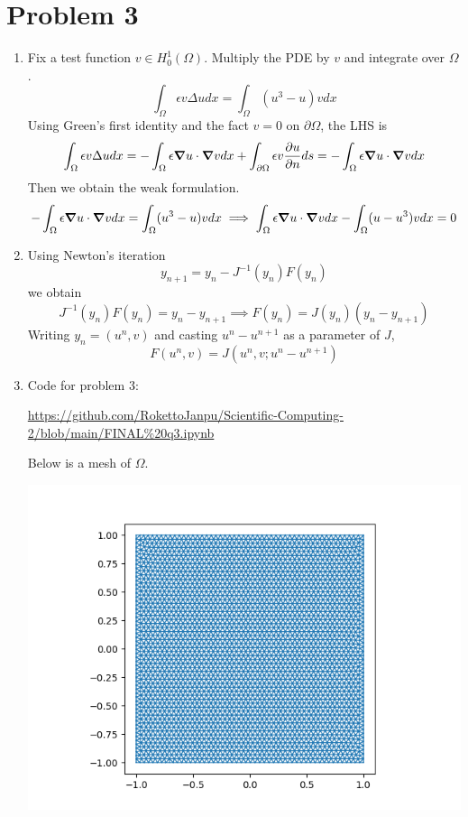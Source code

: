 \documentclass{article}
\newcommand{\ep}{\epsilon}
\newcommand{\inv}{^{-1}}
\newcommand{\imp}{\implies}
\newcommand{\ptl}{\partial}
\newcommand{\Om}{\Omega}
\begin{document}
\section*{Problem 3}

\begin{enumerate}[label=(\alph*)]
	
\item
Fix a test function $v\in H_0^1(\Omega)$. Multiply the PDE by $v$ and integrate over $\Omega$.
$$\int_\Om \ep v\Delta udx = \int_\Om (u^3-u)vdx$$
Using Green's first identity and the fact $v=0$ on $\ptl\Om$, the LHS is
$$\int_\Om \ep v\Delta udx = -\int_\Om \ep\grad u\cdot\grad vdx + \int_{\ptl\Om} \ep v\pdv{u}{n}ds
= -\int_\Om \ep\grad u\cdot\grad vdx$$
Then we obtain the weak formulation.
$$-\int_\Om \ep\grad u\cdot\grad vdx = \int_\Om (u^3-u)vdx
\imp \int_\Om \ep\grad u\cdot\grad vdx - \int_\Om (u-u^3)vdx = 0$$


\item
Using Newton's iteration
$$y_{n+1} = y_n - J\inv(y_n)F(y_n)$$
we obtain
$$J\inv(y_n)F(y_n) = y_n - y_{n+1}
\imp F(y_n) = J(y_n)(y_n - y_{n+1})$$
Writing $y_n=(u^n,v)$ and casting $u^n-u^{n+1}$ as a parameter of $J$,
$$F(u^n,v) = J(u^n,v;u^n-u^{n+1})$$


\item
Code for problem 3:

\url{https://github.com/RokettoJanpu/Scientific-Computing-2/blob/main/FINAL%20q3.ipynb}

Below is a mesh of $\Omega$.

\begin{center}
	\includegraphics[scale=.5]{FINAL q3 mesh}
\end{center}
\end{enumerate}
	
\end{document}
